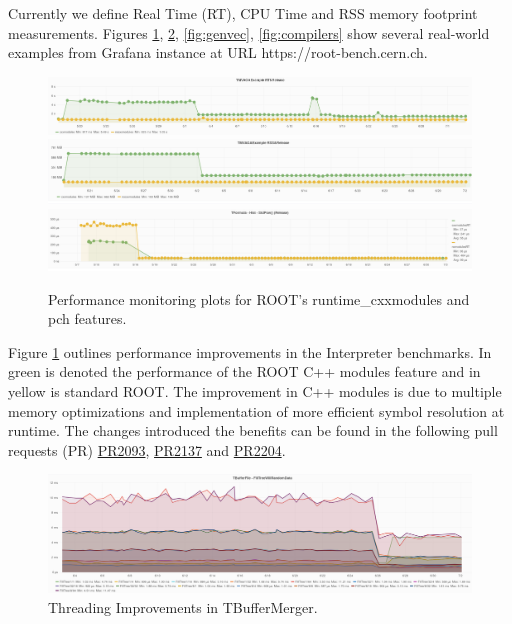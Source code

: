 \documentclass{webofc}
\begin{document}
Currently we define Real Time (RT), CPU Time and RSS memory footprint measurements. Figures \ref{interp}, \ref{tbuf}, \ref{fig:genvec}, \ref{fig:compilers} show several real-world examples from Grafana instance at URL https://root-bench.cern.ch.

\begin{figure}[h]
\centering
\includegraphics[width=0.8\linewidth]{pictures/1.png}
\includegraphics[width=0.8\linewidth]{pictures/2.png}
\includegraphics[width=0.8\linewidth]{pictures/4.png}
\caption{Performance monitoring plots for ROOT's runtime\_cxxmodules and pch features.}
\label{interp}
\end{figure}

Figure \ref{interp} outlines performance improvements in the Interpreter benchmarks. In green is denoted the performance of the ROOT C++ modules feature \cite{modules} and in yellow is standard ROOT. The improvement in C++ modules is due to multiple memory optimizations and implementation of more efficient symbol resolution at runtime. The changes introduced the benefits can be found in the following pull requests (PR) \href{https://github.com/root-project/root/pull/2093}{PR2093}, \href{https://github.com/root-project/root/pull/2137}{PR2137} and \href{https://github.com/root-project/root/pull/2204}{PR2204}.


\begin{figure}[h]
\centering
\includegraphics[width=0.8\linewidth]{pictures/5.png}
\caption{Threading Improvements in TBufferMerger.}
\label{tbuf}
\end{figure}
\end{document}
